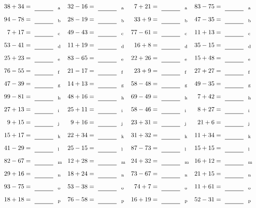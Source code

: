 \documentclass
[
  draft    = true,
  fontsize = 11pt,
  parskip  = half-
]
{scrartcl}
\begin{document}
\clearpage
\begin{align*}
    \pline{38+34}&=\rline{a}
  & \pline{32-16}&=\rline{a}
  & \pline{7+21}&=\rline{a}
  & \pline{83-75}&=\rline{a} \\[1ex]
    \pline{94-78}&=\rline{b}
  & \pline{28-19}&=\rline{b}
  & \pline{33+9}&=\rline{b}
  & \pline{47-35}&=\rline{b} \\[1ex]
    \pline{7+17}&=\rline{c}
  & \pline{49-43}&=\rline{c}
  & \pline{77-61}&=\rline{c}
  & \pline{11+13}&=\rline{c} \\[1ex]
    \pline{53-41}&=\rline{d}
  & \pline{11+19}&=\rline{d}
  & \pline{16+8}&=\rline{d}
  & \pline{35-15}&=\rline{d} \\[1ex]
    \pline{25+23}&=\rline{e}
  & \pline{83-65}&=\rline{e}
  & \pline{22+26}&=\rline{e}
  & \pline{15+48}&=\rline{e} \\[1ex]
    \pline{76-55}&=\rline{f}
  & \pline{21-17}&=\rline{f}
  & \pline{23+9}&=\rline{f}
  & \pline{27+27}&=\rline{f} \\[1ex]
    \pline{47-39}&=\rline{g}
  & \pline{14+13}&=\rline{g}
  & \pline{58-48}&=\rline{g}
  & \pline{49-35}&=\rline{g} \\[1ex]
    \pline{99-81}&=\rline{h}
  & \pline{48+16}&=\rline{h}
  & \pline{69-49}&=\rline{h}
  & \pline{7+42}&=\rline{h} \\[1ex]
    \pline{27+13}&=\rline{i}
  & \pline{25+11}&=\rline{i}
  & \pline{58-46}&=\rline{i}
  & \pline{8+27}&=\rline{i} \\[1ex]
    \pline{9+15}&=\rline{j}
  & \pline{9+16}&=\rline{j}
  & \pline{23+31}&=\rline{j}
  & \pline{21+6}&=\rline{j} \\[1ex]
    \pline{15+17}&=\rline{k}
  & \pline{22+34}&=\rline{k}
  & \pline{31+32}&=\rline{k}
  & \pline{11+34}&=\rline{k} \\[1ex]
    \pline{41-29}&=\rline{l}
  & \pline{25-15}&=\rline{l}
  & \pline{87-73}&=\rline{l}
  & \pline{15+15}&=\rline{l} \\[1ex]
    \pline{82-67}&=\rline{m}
  & \pline{12+28}&=\rline{m}
  & \pline{24+32}&=\rline{m}
  & \pline{16+12}&=\rline{m} \\[1ex]
    \pline{29+16}&=\rline{n}
  & \pline{18+24}&=\rline{n}
  & \pline{73-67}&=\rline{n}
  & \pline{21+15}&=\rline{n} \\[1ex]
    \pline{93-75}&=\rline{o}
  & \pline{53-38}&=\rline{o}
  & \pline{74+7}&=\rline{o}
  & \pline{11+61}&=\rline{o} \\[1ex]
    \pline{18+18}&=\rline{p}
  & \pline{76-58}&=\rline{p}
  & \pline{16+19}&=\rline{p}
  & \pline{52-31}&=\rline{p}
\end{align*}
\end{document}
